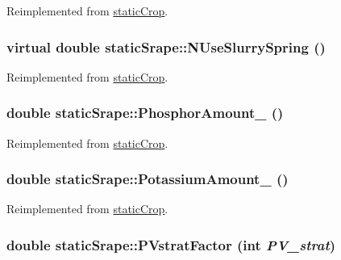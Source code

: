 Reimplemented from \hyperlink{classstatic_crop_a6b89d7839db435c7ceafa2755312182e}{staticCrop}.\hypertarget{classstatic_srape_a1f6da756880c654f33ca67d83aea2a3a}{
\subsubsection[{NUseSlurrySpring}]{\setlength{\rightskip}{0pt plus 5cm}virtual double staticSrape::NUseSlurrySpring ()}}
\label{classstatic_srape_a1f6da756880c654f33ca67d83aea2a3a}


Reimplemented from \hyperlink{classstatic_crop_ae7d21ab4afc8d8355d231566e8d87b1b}{staticCrop}.\hypertarget{classstatic_srape_ad364cf81c5e8888cd2c7efcf32a18d49}{
\subsubsection[{PhosphorAmount\_\-}]{\setlength{\rightskip}{0pt plus 5cm}double staticSrape::PhosphorAmount\_\- ()}}
\label{classstatic_srape_ad364cf81c5e8888cd2c7efcf32a18d49}


Reimplemented from \hyperlink{classstatic_crop_abaa5c59d4074d47dedc79172f8326e08}{staticCrop}.\hypertarget{classstatic_srape_a277f6842674f253537e81c07e60f5cc6}{
\subsubsection[{PotassiumAmount\_\-}]{\setlength{\rightskip}{0pt plus 5cm}double staticSrape::PotassiumAmount\_\- ()}}
\label{classstatic_srape_a277f6842674f253537e81c07e60f5cc6}


Reimplemented from \hyperlink{classstatic_crop_a41fee98d728c7670e6acb504a9b3459d}{staticCrop}.\hypertarget{classstatic_srape_a30c92b0c5720bfdaf6c52bbb6648ca2f}{
\subsubsection[{PVstratFactor}]{\setlength{\rightskip}{0pt plus 5cm}double staticSrape::PVstratFactor (int {\em PV\_\-strat})}}
\label{classstatic_srape_a30c92b0c5720bfdaf6c52bbb6648ca2f}


